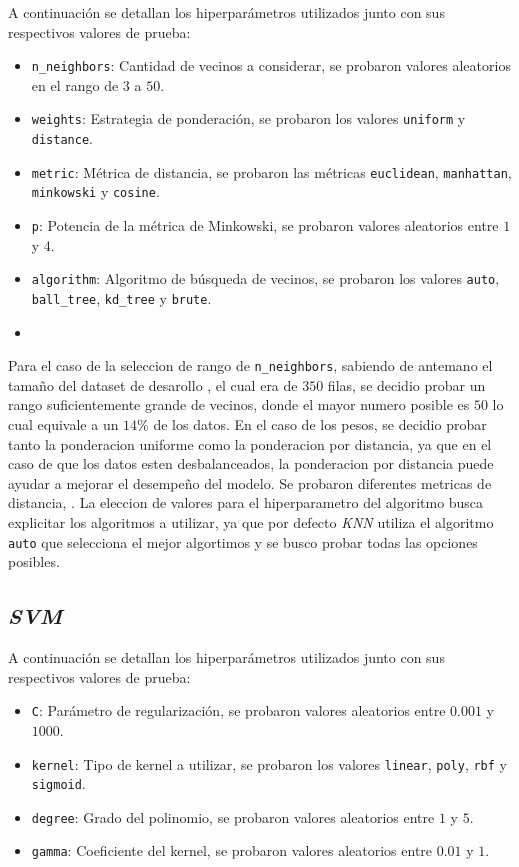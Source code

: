 \documentclass[10pt,a4paper]{article}
\begin{document}
A continuación se detallan los hiperparámetros utilizados junto con sus respectivos valores de prueba:

\begin{itemize}
    \item \texttt{n\_neighbors}: Cantidad de vecinos a considerar, se probaron valores aleatorios en el rango de $3$ a $50$.
    \item \texttt{weights}: Estrategia de ponderación, se probaron los valores \texttt{uniform} y \texttt{distance}.
    \item \texttt{metric}: Métrica de distancia, se probaron las métricas \texttt{euclidean}, \texttt{manhattan}, \texttt{minkowski} y \texttt{cosine}.
    \item \texttt{p}: Potencia de la métrica de Minkowski, se probaron valores aleatorios entre $1$ y $4$.
    \item \texttt{algorithm}: Algoritmo de búsqueda de vecinos, se probaron los valores \texttt{auto}, \texttt{ball\_tree}, \texttt{kd\_tree} y \texttt{brute}.
    \item 
\end{itemize}
Para el caso de la seleccion de rango de \texttt{n\_neighbors}, sabiendo de antemano el tamaño del dataset de desarollo , el cual era de $350$ filas, 
se decidio probar un rango suficientemente grande de vecinos, donde el mayor numero posible es $50$ lo cual equivale a un $14\%$ de los datos. En el caso de los pesos,
 se decidio probar tanto la ponderacion uniforme como la ponderacion por distancia, ya que en el caso de que los datos esten desbalanceados, la ponderacion por distancia puede ayudar a mejorar el desempeño del modelo.
Se probaron diferentes metricas de distancia, . La eleccion de valores para el hiperparametro del algoritmo busca explicitar los algoritmos a utilizar, ya que por defecto \textit{KNN} utiliza el algoritmo \texttt{auto} 
que selecciona el mejor algortimos y se busco probar todas las opciones posibles.
\subsection{\textit{SVM}}

A continuación se detallan los hiperparámetros utilizados junto con sus respectivos valores de prueba:
\begin{itemize}
    \item \texttt{C}: Parámetro de regularización, se probaron valores aleatorios entre $0.001$ y $1000$.
    \item \texttt{kernel}: Tipo de kernel a utilizar, se probaron los valores \texttt{linear}, \texttt{poly}, \texttt{rbf} y \texttt{sigmoid}.
    \item \texttt{degree}: Grado del polinomio, se probaron valores aleatorios entre $1$ y $5$.
    \item \texttt{gamma}: Coeficiente del kernel, se probaron valores aleatorios entre $0.01$ y $1$.
\end{itemize}
\end{document}
